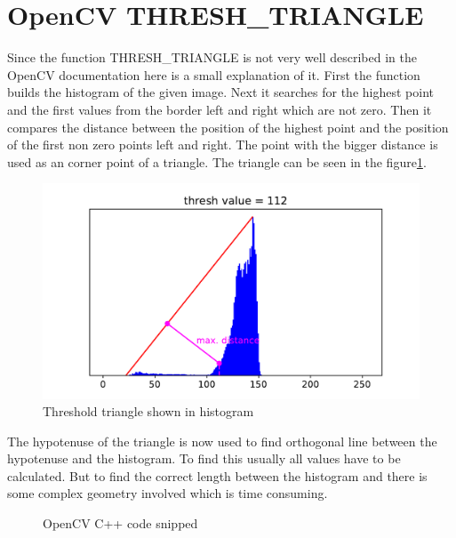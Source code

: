 \section{OpenCV THRESH\_TRIANGLE }
Since the function THRESH\_TRIANGLE is not very well described in the OpenCV documentation here is a small explanation of it. First the function builds the histogram of the given image. Next it searches for the highest point and the first values from the border left and right which are not zero. Then it compares the distance between the position of the highest point and the position of the first non zero points left and right. The point with the bigger distance is used as an corner point of a triangle. The triangle can be seen in the figure\ref{theory:triangle}.

\begin{figure}[ht]
	\centering
	\includegraphics[width=\textwidth]{2-theory/threshold/triangle.pdf}
	\caption{Threshold triangle shown in histogram\label{theory:triangle}}
\end{figure} 
The hypotenuse of the triangle is now used to find orthogonal line between the hypotenuse and the histogram. To find this usually all values have to be calculated. But to find the correct length between the histogram and there is some complex geometry involved which is time consuming.


\lstset{style=mystyle}


\begin{figure}[ht]
	\centering
	
	\caption{OpenCV C++ code snipped}
	\label{theory:code}
\end{figure}
